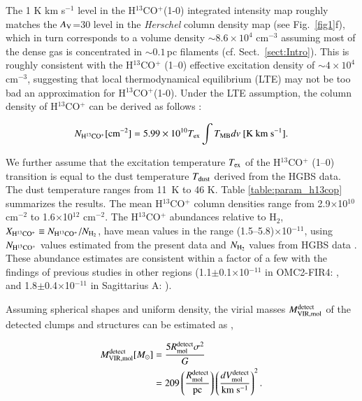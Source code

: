 \documentclass{aa}
\begin{document}
{
The 1 K km s$^{-1}$ level in the H$^{13}$CO$^+$(1-0) integrated intensity map roughly matches the $A_{\rm V}$=30 level 
in the {\it Herschel} column density map (see Fig.~\ref{fig1}f), 
which in turn corresponds to a volume density $\sim  8.6 \times10^{4}$ cm$^{-3}$ 
assuming most of the dense gas is concentrated in $\sim 0.1\,$pc filaments (cf. Sect.~\ref{sect:Intro}). 
This is roughly consistent with the H$^{13}$CO$^{+}$ (1--0) effective excitation  density of $\sim4 \times 10^{4}$ cm$^{-3}$, 
suggesting that local thermodynamical equilibrium (LTE) may not be too bad an approximation for H$^{13}$CO$^+$(1-0).
Under the LTE assumption,} the column density of H$^{13}$CO$^+$ can be {derived} as follows \citep[cf.][]{Tsuboi11}: 

\begin{equation}\label{eq:h13cop_column}
N_{\rm H^{13}CO^+} [{\rm cm^{-2}}] = 5.99 \times 10^{10} T_{\rm ex} \int T_{\rm MB} dv\ [{\rm K\ km\ s^{-1}}].  
\end{equation}

\noindent We further assume that the excitation temperature $T_{\rm ex}$ of the H$^{13}$CO$^+$ (1--0) transition is equal to the dust temperature $T_{\rm dust}$ derived from the HGBS data. 
The dust temperature ranges from 11~K to 46 K.
Table \ref{table:param_h13cop} summarizes the results. 
The mean H$^{13}$CO$^+$ column densities range from 2.9$\times$10$^{10}$ cm$^{-2}$ to 1.6$\times$10$^{12}$ cm$^{-2}$. 
The H$^{13}$CO$^+$ abundances relative to H$_2$,
$X_{\rm H^{13}CO^+} \equiv N_{\rm H^{13}CO^+}/N_{\rm H_2}$, have mean values in the range (1.5--5.8)$\times$10$^{-11}$, 
using  $N_{\rm H^{13}CO^+}$ values estimated from the present data and $N_{\rm H_2}$ values from HGBS data \citep{Andre10,Konyves15}.
These abundance estimates are consistent within a factor of a few 
with the findings of previous studies in other regions  
(1.1$\pm$0.1$\times$10$^{-11}$ in OMC2-FIR4: \citet{Shimajiri15b}, and 1.8$\pm$0.4$\times$10$^{-11}$ in Sagittarius A: \citet{Tsuboi11}). 

Assuming 
spherical shapes and uniform density, 
the virial masses $M_{\rm VIR,mol}^{\rm detect}$ of the detected clumps and structures 
can be estimated as \citep[see][]{Ikeda07, Shimajiri15a}, 

\begin{equation}\label{eq:virial_mass}
\begin{split}
M_{\rm VIR,mol}^{\rm detect} [M_{\odot}] & = \frac{5 R_{\rm mol}^{\rm detect} \sigma^2 }{G} \\
 &  = 209 \left(\frac{R_{\rm mol}^{\rm detect}}{\rm pc} \right) \left(\frac{dV_{\rm mol}^{\rm detect}}{\rm km\ s^{-1}} \right)^2.
\end{split}
\end{equation}
\end{document}
